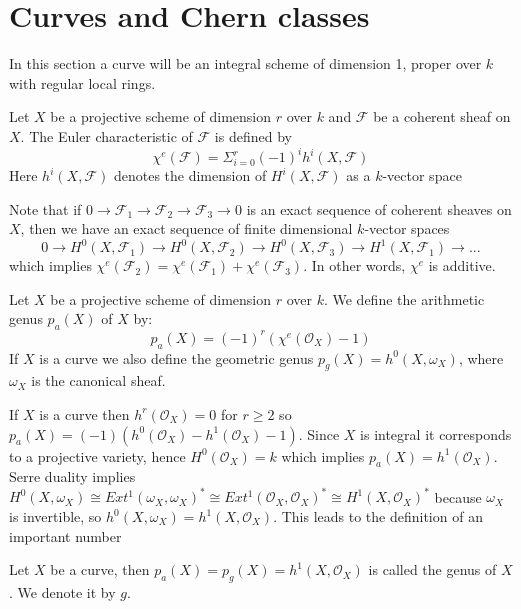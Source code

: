 \documentclass[
	oldfontcommands,
	sumario=abnt-6027-2012,
	12pt,			%
	openright,		%
	oneside,		%
	a4paper,		%
	english,		%
	brazil			%
	]{imecc-unicamp}
\begin{document}
\section{Curves and Chern classes}
In this section a curve will be an integral scheme of dimension 1, proper over $k$ with regular local rings.
\begin{definition}
	Let $X$ be a projective scheme of dimension $r$ over $k$ and $\mathcal{F}$ be a coherent sheaf on $X$. The Euler characteristic of $\mathcal{F}$ is defined by
	\begin{equation}
		\chi^e(\mathcal{F}) = \Sigma_{i=0}^{r} (-1)^i h^i(X,\mathcal{F})
	\end{equation}
Here $h^i(X,\mathcal{F})$ denotes the dimension of $H^i(X,\mathcal{F})$ as a $k$-vector space
\end{definition}
Note that if $0 \to \mathcal{F}_1 \to \mathcal{F}_2 \to \mathcal{F}_3 \to 0$ is an exact sequence of coherent sheaves on $X$, then we have an exact sequence of finite dimensional $k$-vector spaces
\begin{equation}
0 \to H^0(X,\mathcal{F}_1) \to H^0(X,\mathcal{F}_2) \to H^0(X,\mathcal{F}_3) \to H^1(X,\mathcal{F}_1) \to ...
\end{equation}
which implies $\chi^e(\mathcal{F}_2)=\chi^e(\mathcal{F}_1)+\chi^e(\mathcal{F}_3)$. In other words, $\chi^e$ is additive.
\begin{definition}
	Let $X$ be a projective scheme of dimension $r$ over $k$. We define the arithmetic genus $p_a(X)$ of $X$ by:
	\begin{equation}
		p_a(X)=(-1)^r(\chi^e(\mathcal{O}_X)-1)
	\end{equation}
	If $X$ is a curve we also define the geometric genus $p_g(X)=h^0(X,\omega_X)$, where $\omega_X$ is the canonical sheaf.
\end{definition}
If $X$ is a curve then $h^r(\mathcal{O}_X)=0$ for $r \geq 2$ so $p_a(X)=(-1)(h^0(\mathcal{O}_X)-h^1(\mathcal{O}_X)-1)$. Since $X$ is integral it corresponds to a projective variety, hence $H^0(\mathcal{O}_X)=k$ which implies $p_a(X)=h^1(\mathcal{O}_X)$. Serre duality implies $H^0(X,\omega_X) \cong Ext^1(\omega_X,\omega_X)^* \cong Ext^1(\mathcal{O}_X,\mathcal{O}_X)^* \cong H^1(X,\mathcal{O}_X)^*$ because $\omega_X$ is invertible, so $h^0(X,\omega_X)=h^1(X,\mathcal{O}_X)$. This leads to the definition of an important number
\begin{definition}
	Let $X$ be a curve, then $p_a(X)=p_g(X)=h^1(X,\mathcal{O}_X)$ is called the genus of $X$. We denote it by $g$.
\end{definition}
\end{document}
